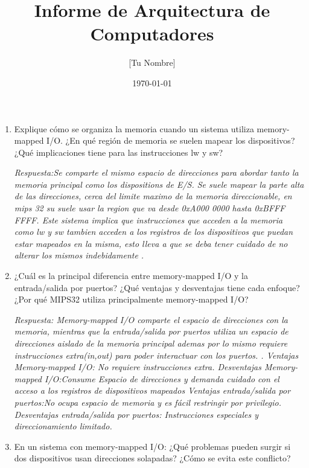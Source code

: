 \documentclass[11pt, a4paper]{article}
\title{\textbf{Informe de Arquitectura de Computadores}}
\author{[Tu Nombre]}
\date{\today}
\begin{document}
\maketitle

\begin{enumerate}[leftmargin=*, label=\arabic*.]
    \item Explique cómo se organiza la memoria cuando un sistema utiliza memory-mapped I/O. ¿En qué región de memoria se suelen mapear los dispositivos? ¿Qué implicaciones tiene para las instrucciones lw y sw?
    
    \vspace{0.2cm}
    \textit{Respuesta:Se comparte el mismo espacio de direcciones para abordar tanto la memoria principal como los dispositions de E/S. Se suele mapear la parte alta de las direcciones, cerca del limite maximo de la memoria direccionable, en mips 32 su suele usar la region que va desde 0xA000 0000 hasta 0xBFFF FFFF. Este sistema implica que instrucciones que acceden a la memoria como lw y sw tambien acceden a los registros de los dispositivos que puedan estar mapeados en la misma, esto lleva a que se deba tener cuidado de no alterar los mismos indebidamente .}
    \vspace{1.5cm}

    \item ¿Cuál es la principal diferencia entre memory-mapped I/O y la entrada/salida por puertos? ¿Qué ventajas y desventajas tiene cada enfoque? ¿Por qué MIPS32 utiliza principalmente memory-mapped I/O?
    
    \vspace{0.2cm}
    \textit{Respuesta: Memory-mapped I/O comparte el espacio de direcciones con la memoria, mientras que la entrada/salida por puertos utiliza un espacio de direcciones aislado de la memoria principal ademas por lo mismo requiere instrucciones extra(in,out) para poder interactuar con los puertos. .
    Ventajas Memory-mapped I/O: No requiere instrucciones extra.
    Desventajas Memory-mapped I/O:Consume Espacio de direcciones y demanda cuidado con el acceso a los registros de dispositivos mapeados
    Ventajas entrada/salida por puertos:No ocupa espacio de memoria y es fácil restringir por privilegio.
    Desventajas entrada/salida por puertos: Instrucciones especiales y direccionamiento limitado.}
    \vspace{1.5cm}

    \item En un sistema con memory-mapped I/O: ¿Qué problemas pueden surgir si dos dispositivos usan direcciones solapadas? ¿Cómo se evita este conflicto?
    

\end{enumerate}
\end{document}
